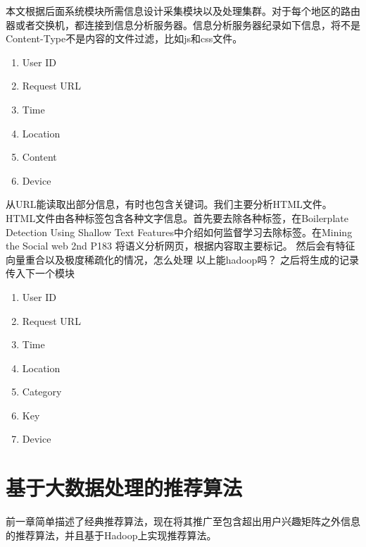 本文根据后面系统模块所需信息设计采集模块以及处理集群。对于每个地区的路由器或者交换机，都连接到信息分析服务器。信息分析服务器纪录如下信息，将不是Content-Type不是内容的文件过滤，比如js和css文件。
\begin{enumerate}
 \item User ID
 \item Request URL
 \item Time
 \item Location
 \item Content
 \item Device
\end{enumerate}
从URL能读取出部分信息，有时也包含关键词。我们主要分析HTML文件。HTML文件由各种标签包含各种文字信息。首先要去除各种标签，在Boilerplate Detection Using Shallow Text Features中介绍如何监督学习去除标签。在Mining the Social web 2nd P183
将语义分析网页，根据内容取主要标记。
然后会有特征向量重合以及极度稀疏化的情况，怎么处理
以上能hadoop吗？
之后将生成的记录传入下一个模块
\begin{enumerate}
 \item User ID
 \item Request URL
 \item Time
 \item Location
 \item Category
 \item Key
 \item Device
\end{enumerate}

\section{基于大数据处理的推荐算法}
前一章简单描述了经典推荐算法，现在将其推广至包含超出用户兴趣矩阵之外信息的推荐算法，并且基于Hadoop上实现推荐算法。